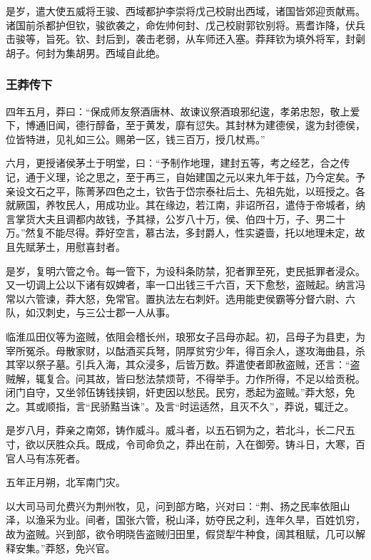 \documentclass[]{article}
\begin{document}
是岁，遣大使五威将王骏、西域都护李崇将戊己校尉出西域，诸国皆郊迎贡献焉。诸国前杀都护但钦，骏欲袭之，命佐帅何封、戊己校尉郭钦别将。焉耆诈降，伏兵击骏等，旨死。钦、封后到，袭击老弱，从车师还入塞。莽拜钦为填外将军，封劋胡子。何封为集胡男。西域自此绝。

\hypertarget{header-n6907}{%
\subsubsection{王莽传下}\label{header-n6907}}

四年五月，莽曰：``保成师友祭酒唐林、故谏议祭酒琅邪纪逡，孝弟忠恕，敬上爱下，博通旧闻，德行醇备，至于黄发，靡有愆失。其封林为建德侯，逡为封德侯，位皆特进，见礼如三公。赐弟一区，钱三百万，授几杖焉。''

六月，更授诸侯茅土于明堂，曰：``予制作地理，建封五等，考之经艺，合之传记，通于义理，论之思之，至于再三，自始建国之元以来九年于兹，乃今定矣。予亲设文石之平，陈菁茅四色之土，钦告于岱宗泰社后土、先祖先妣，以班授之。各就厥国，养牧民人，用成功业。其在缘边，若江南，非诏所召，遣侍于帝城者，纳言掌货大夫且调都内故钱，予其禄，公岁八十万，侯、伯四十万，子、男二十万。''然复不能尽得。莽好空言，慕古法，多封爵人，性实遴啬，托以地理未定，故且先赋茅土，用慰喜封者。

是岁，复明六管之令。每一管下，为设科条防禁，犯者罪至死，吏民抵罪者浸众。又一切调上公以下诸有奴婢者，率一口出钱三千六百，天下愈愁，盗贼起。纳言冯常以六管谏，莽大怒，免常官。置执法左右刺奸。选用能吏侯霸等分督六尉、六队，如汉刺史，与三公士郡一人从事。

临淮瓜田仪等为盗贼，依阻会稽长州，琅邪女子吕母亦起。初，吕母子为县吏，为宰所冤杀。母散家财，以酤酒买兵弩，阴厚贫穷少年，得百余人，遂攻海曲县，杀其宰以祭子墓。引兵入海，其众浸多，后皆万数。莽遣使者即赦盗贼，还言：``盗贼解，辄复合。问其故，皆曰愁法禁烦苛，不得举手。力作所得，不足以给贡税。闭门自守，又坐邻伍铸钱挟铜，奸吏因以愁民。民穷，悉起为盗贼。''莽大怒，免之。其或顺指，言``民骄黠当诛''。及言``时运适然，且灭不久''，莽说，辄迁之。

是岁八月，莽亲之南郊，铸作威斗。威斗者，以五石铜为之，若北斗，长二尺五寸，欲以厌胜众兵。既成，令司命负之，莽出在前，入在御旁。铸斗日，大寒，百官人马有冻死者。

五年正月朔，北军南门灾。

以大司马司允费兴为荆州牧，见，问到部方略，兴对曰：``荆、扬之民率依阻山泽，以渔采为业。间者，国张六管，税山泽，妨夺民之利，连年久旱，百姓饥穷，故为盗贼。兴到部，欲令明晓告盗贼归田里，假贷犁牛种食，阔其租赋，几可以解释安集。''莽怒，免兴官。
\end{document}
